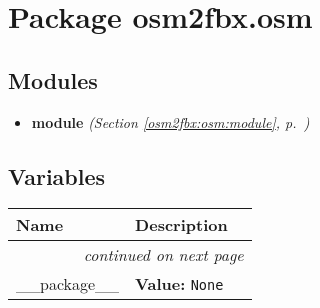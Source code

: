 %
%
%


\section{Package osm2fbx.osm}

    \label{osm2fbx:osm}


\subsection{Modules}

\begin{itemize}
\setlength{\parskip}{0ex}
\item \textbf{module}
  \textit{(Section \ref{osm2fbx:osm:module}, p.~\pageref{osm2fbx:osm:module})}

\end{itemize}



  \subsection{Variables}

    \vspace{-1cm}
\hspace{\varindent}\begin{longtable}{|p{\varnamewidth}|p{\vardescrwidth}|l}
\cline{1-2}
\cline{1-2} \centering \textbf{Name} & \centering \textbf{Description}& \\
\cline{1-2}
\endhead\cline{1-2}\multicolumn{3}{r}{\small\textit{continued on next page}}\\\endfoot\cline{1-2}
\endlastfoot\raggedright \_\-\_\-p\-a\-c\-k\-a\-g\-e\-\_\-\_\- & \raggedright \textbf{Value:} 
{\tt None}&\\
\cline{1-2}
\end{longtable}

